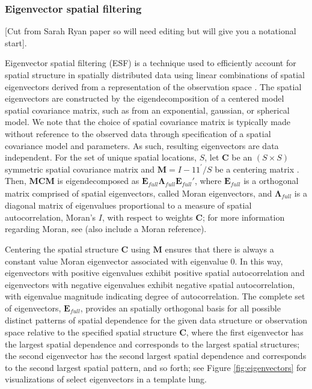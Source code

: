 \documentclass[12pt]{article}
\begin{document}
\subsubsection{Eigenvector spatial filtering}
[Cut from Sarah Ryan paper so will need editing but will give you a notational start]. 

Eigenvector spatial filtering (ESF) is a technique used to efficiently account for spatial structure in spatially distributed data using linear combinations of spatial eigenvectors derived from a representation of the observation space \citep{griffith1996spatial}. The spatial eigenvectors are constructed by the eigendecomposition of a centered model spatial covariance matrix, such as from an exponential, gaussian, or spherical model. We note that the choice of spatial covariance matrix is typically made without reference to the observed data through specification of a spatial covariance model and parameters. As such, resulting eigenvectors are data independent. For the set of unique spatial locations, $S$, let $\mathbf{C}$ be an $(S \times S)$ symmetric spatial covariance matrix and $\mathbf{M}=I - 11^\prime/S$ be a centering matrix \citep{griffith1996spatial}. Then, $\mathbf{M} \mathbf{C} \mathbf{M}$ is eigendecomposed as $\mathbf{E}_\textit{full} \mathbf{\Lambda}_\textit{full} \mathbf{E}_\textit{full}'$, where $\mathbf{E}_\textit{full}$ is a orthogonal matrix comprised of spatial eigenvectors, called Moran eigenvectors, and $\mathbf{\Lambda}_\textit{full}$ is a diagonal matrix of eigenvalues proportional to a measure of spatial autocorrelation, Moran's $I$, with respect to weights $\mathbf{C}$; for more information regarding Moran, see \cite{murakami2019eigenvector} (also include a Moran reference).  

Centering the spatial structure $\mathbf C$ using $\mathbf M$ ensures that there is always a constant value Moran eigenvector associated with eigenvalue 0. In this way, eigenvectors with positive eigenvalues exhibit positive spatial autocorrelation and eigenvectors with negative eigenvalues exhibit negative spatial autocorrelation, with eigenvalue magnitude indicating degree of autocorrelation. The complete set of eigenvectors, $\mathbf{E}_\textit{full}$, provides an spatially orthogonal basis for all possible distinct patterns of spatial dependence for the given data structure or observation space relative to the specified spatial structure $\mathbf{C}$, where the first eigenvector has the largest spatial dependence and corresponds to the largest spatial structures; the second eigenvector has the second largest spatial dependence and corresponds to the second largest spatial pattern, and so forth; see Figure \ref{fig:eigenvectors} for visualizations of select eigenvectors in a template lung.
\end{document}

